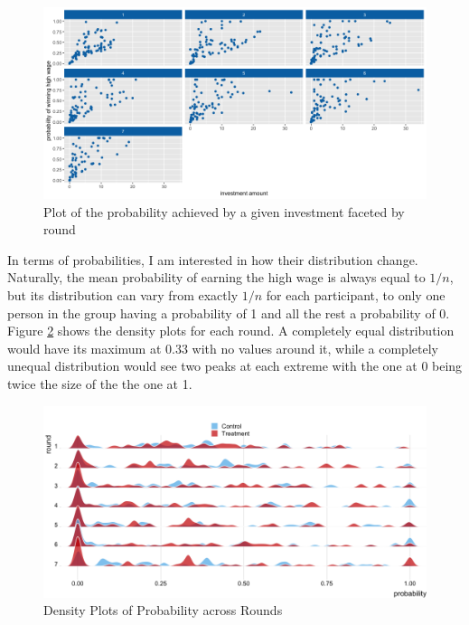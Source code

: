 \begin{figure}
    \centering
    \includegraphics[width=\textwidth]{graphs/invest_prob_point.png}
    \caption{Plot of the probability achieved by a given investment faceted by round}
    \label{fig:invest_prob_point}
\end{figure}

In terms of probabilities, I am interested in how their distribution change. Naturally, the mean probability of earning the high wage is always equal to $1/n$, but its distribution can vary from exactly $1/n$ for each participant, to only one person in the group having a probability of 1 and all the rest a probability of 0. Figure \ref{fig:dens_prob} shows the density plots for each round. A completely equal distribution would have its maximum at 0.33 with no values around it, while a completely unequal distribution would see two peaks at each extreme with the one at 0 being twice the size of the the one at 1.\\

\begin{figure}[H]
    \centering
    \includegraphics[width = \textwidth]{graphs/density_ridge_prob.png}
    \caption{Density Plots of Probability across Rounds}
    \label{fig:dens_prob}
\end{figure}

